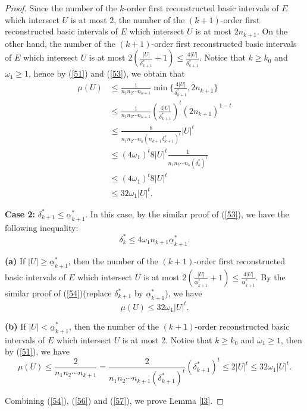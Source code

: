 \documentclass[reqno]{amsart}
\theoremstyle{plain}
\theoremstyle{definition}
\theoremstyle{remark}
\numberwithin{equation}{section} \DeclareMathOperator\intr{int}
\begin{document}
\begin{proof}
Since the number of the $k$-order first reconstructed  basic intervals of $E$ which intersect $U$ is at most 2, the number of the $(k+1)$-order first reconstructed basic intervals of $E$ which intersect $U$ is at most $2n_{k+1}$. On the other hand, the number of the $(k+1)$-order first reconstructed basic intervals of $E$ which intersect $U$ is at most $2(\frac{\left | U \right |}{\delta^*_{k+1}}+1)\le \frac{4\left | U \right |}{\delta^*_{k+1}}$. Notice that $k\ge k_{0}$ and $\omega_1\ge 1$, hence by (\ref{51}) and (\ref{53}), we obtain that
\begin{equation}\label{54}
\begin{aligned}
 \mu(U)&\le \frac{1}{n_1n_2\cdots n_{k+1}}\min\{\frac{4\left | U \right |}{\delta^*_{k+1}},2n_{k+1}\}\\
       &\le \frac{1}{n_1n_2\cdots n_{k+1}}(\frac{4\left | U \right |}{\delta^*_{k+1}})^t(2n_{k+1})^{1-t}\\
&\le \frac{8}{n_1n_2\cdots n_k(n_{k+1}\delta^*_{k+1})^t} \left | U \right |^t\\
&\le (4\omega_1 )^t8\left | U \right |^t \frac{1}{n_1n_2\cdots n_k(\delta^*_k)^t}\\
&\le (4\omega_1 )^t8\left | U \right |^t\\
&\le 32\omega_1\left | U \right |^t.
\end{aligned}
\end{equation}

\textbf{Case 2:} $\delta^*_{k+1}\le \underline\alpha^*_{k+1}$.
In this case, by the similar proof of (\ref{53}), we have the following inequality:
\begin{equation}\label{55}
\delta^*_k\le 4\omega_1n_{k+1}\underline\alpha^*_{k+1}.
\end{equation}



\textbf{(a)} If $\left | U \right |\ge \underline\alpha^*_{k+1}$, then the number of the $(k+1)$-order first reconstructed basic intervals of $E$ which intersect $U$ is at most $2(\frac{\left | U \right |}{\underline\alpha^*_{k+1}}+1)\le \frac{4\left | U \right |}{\underline\alpha^*_{k+1}}$. By the similar proof of (\ref{54})(replace $\delta^*_{k+1}$ by $\underline\alpha^*_{k+1}$),  we have
\begin{equation}\label{56}
\mu(U)\le 32\omega_1\left | U \right |^t.
\end{equation}

\textbf{(b)} If $\left | U \right |< \underline\alpha^*_{k+1}$,  then the number of the $(k+1)$-order reconstructed basic intervals of $E$ which intersect $U$ is at most 2. Notice that $k\ge k_{0}$ and $\omega_{1}\ge 1$, then by (\ref{51}), we have
\begin{equation}\label{57}
\mu(U)\le \frac{2}{n_1n_2\cdots n_{k+1}}=\frac{2}{n_1n_2\cdots n_{k+1}(\delta^*_{k+1})^t}(\delta^*_{k+1})^t \le 2\left | U \right |^t\le 32\omega_{1}\left | U \right |^t.
\end{equation}

   Combining (\ref{54}), (\ref{56}) and (\ref{57}), we prove Lemma \ref{l3}.

\end{proof}
\end{document}
